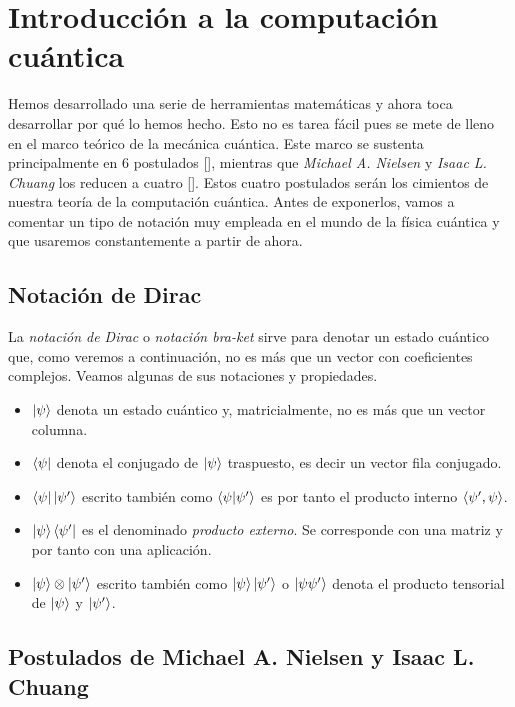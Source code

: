 \chapter{Introducción a la computación cuántica}

Hemos desarrollado una serie de herramientas matemáticas y ahora toca desarrollar por qué lo hemos hecho. Esto no es tarea fácil pues se mete de lleno en el marco teórico de la mecánica cuántica. Este marco se sustenta principalmente en 6 postulados [\cite{cohen1977quantum}], mientras que \textit{Michael A. Nielsen} y \textit{Isaac L. Chuang} los reducen a cuatro [\cite{nielsen2001quantum}]. Estos cuatro postulados serán los cimientos de nuestra teoría de la computación cuántica. Antes de exponerlos, vamos a comentar un tipo de notación muy empleada en el mundo de la física cuántica y que usaremos constantemente a partir de ahora.

\section{Notación de Dirac}

La \textit{notación de Dirac} o \textit{notación bra-ket} sirve para denotar un estado cuántico que, como veremos a continuación, no es más que un vector con coeficientes complejos. Veamos algunas de sus notaciones y propiedades.
\begin{itemize}
\item $\left|\psi\right\rangle$ denota un estado cuántico y, matricialmente, no es más que un vector columna.
\item $\left\langle\psi\right|$ denota el conjugado de $\left|\psi\right\rangle$ traspuesto, es decir un vector fila conjugado.
\item $\left\langle\psi\right|\left|\psi'\right\rangle$ escrito también como $\left\langle\psi|\psi'\right\rangle$ es por tanto el producto interno $\langle\psi',\psi\rangle$.

\item $\left|\psi\right\rangle\left\langle\psi'\right|$ es el denominado \textit{producto externo}. Se corresponde con una matriz y por tanto con una aplicación.

\item $\left|\psi\right\rangle\otimes\left|\psi'\right\rangle$ escrito también como $\left|\psi\right\rangle\left|\psi'\right\rangle$ o $\left|\psi\psi'\right\rangle$ denota el producto tensorial de $\left|\psi\right\rangle$ y $\left|\psi'\right\rangle$.
\end{itemize}

\section{Postulados de Michael A. Nielsen y Isaac L. Chuang}

